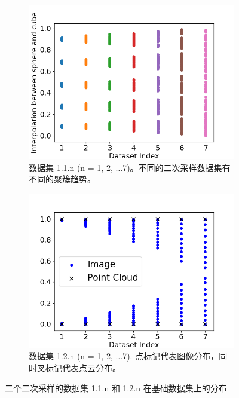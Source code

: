\documentclass[bachelor, nocolorlinks, printoneside]{seuthesis} %
\begin{document}
\begin{Main}
\begin{figure}
	\begin{subfigure}[t]{0.45\linewidth} \centering 
     \includegraphics[width=\columnwidth]{figs/five-clusters.png}
     \caption{\small 数据集 1.1.n (n = 1, 2, $\ldots $7)。不同的二次采样数据集有不同的聚簇趋势。}\label{fig:five-clusters}
   \end{subfigure}\hspace{0.05\textwidth}
   \begin{subfigure}[t]{0.45\linewidth} \centering
     \includegraphics[width=\columnwidth]{figs/two-clusters.png}
     \caption{\small 数据集 1.2.n (n = 1, 2, $\ldots $7). 点标记代表图像分布，同时叉标记代表点云分布。}\label{fig:two-clusters}
   \end{subfigure}
   \caption{\small 二个二次采样的数据集 1.1.n 和 1.2.n 在基础数据集上的分布}
\end{figure}


\end{Main}
\end{document}
